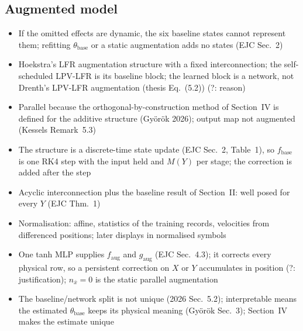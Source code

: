 \subsection{Augmented model}\label{sec:aug_structure}
\ifdraft
\begin{itemize}
\item If the omitted effects are dynamic, the six baseline states cannot represent them; refitting $\theta_{\mathrm{base}}$ or a static augmentation adds no states (EJC Sec.~2)
\item Hoekstra's LFR augmentation structure with a fixed interconnection; the self-scheduled LPV-LFR is its baseline block; the learned block is a network, not Drenth's LPV-LFR augmentation (thesis Eq.~(5.2)) (?: reason)
\item Parallel because the orthogonal-by-construction method of Section~IV is defined for the additive structure (Gy\"or\"ok 2026); output map not augmented (Kessels Remark~5.3)
\item The structure is a discrete-time state update (EJC Sec.~2, Table~1), so $f_{\mathrm{base}}$ is one RK4 step with the input held and $M(Y)$ per stage; the correction is added after the step
\item Acyclic interconnection plus the baseline result of Section~II: well posed for every $Y$ (EJC Thm.~1)
\item Normalisation: affine, statistics of the training records, velocities from differenced positions; later displays in normalised symbols
\item One tanh MLP supplies $f_{\mathrm{aug}}$ and $g_{\mathrm{aug}}$ (EJC Sec.~4.3); it corrects every physical row, so a persistent correction on $X$ or $Y$ accumulates in position (?: justification); $n_{\bar x}=0$ is the static parallel augmentation
\item The baseline/network split is not unique (2026 Sec.~5.2); interpretable means the estimated $\theta_{\mathrm{base}}$ keeps its physical meaning (Gy\"or\"ok Sec.~3); Section~IV makes the estimate unique
\end{itemize}
\fi


